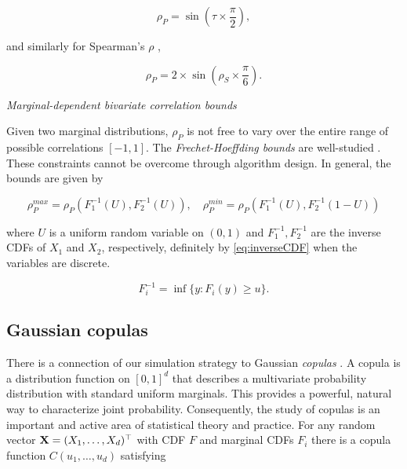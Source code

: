\documentclass[
]{jss}
\begin{document}
\begin{equation}
\label{eq:convertKendall}
\rho_{P} = \sin \left( \tau \times \frac{\pi}{2} \right), 
\end{equation}

\noindent and similarly for Spearman's \(\rho\) \citep{K58},

\begin{equation}
\label{eq:convertSpearman}
\rho_P = 2 \times \sin \left( \rho_S \times \frac{\pi}{6} \right).
\end{equation}

\emph{Marginal-dependent bivariate correlation bounds}

Given two marginal distributions, \(\rho_P\) is not free to vary over the entire range of possible correlations \([-1,1]\). The \emph{Frechet-Hoeffding bounds} are well-studied \citep{Nelsen2007, BF17}. These constraints cannot be overcome through algorithm design. In general, the bounds are given by

\begin{equation}
\label{eq:frechet}
\rho_P^{max} = \rho_P \left( F^{-1}_1 (U), F^{-1}_2 (U) \right), \quad \rho_P^{min} = \rho_P \left( F^{-1}_1 (U), F^{-1}_2 (1 - U) \right)
\end{equation}

\noindent where \(U\) is a uniform random variable on \((0,1)\) and \(F^{-1}_1, F^{-1}_2\) are the inverse CDFs of \(X_1\) and \(X_2\), respectively, definitely by \eqref{eq:inverseCDF} when the variables are discrete.

\begin{equation}
F_{i}^{-1} = \inf\{y:F_{i}(y) \geq u \}.
\label{eq:inverseCDF}
\end{equation}

\hypertarget{gaussian-copulas}{%
\subsection{Gaussian copulas}\label{gaussian-copulas}}

There is a connection of our simulation strategy to Gaussian \emph{copulas} \citep{Nelsen2007}. A copula is a distribution function on \([0,1]^d\) that describes a multivariate probability distribution with standard uniform marginals. This provides a powerful, natural way to characterize joint probability. Consequently, the study of copulas is an important and active area of statistical theory and practice. For any random vector \({\bf X}=(X_1, \ldots, X_d)^\top\) with CDF \(F\) and marginal CDFs \(F_i\) there is a copula function \(C(u_1, \ldots, u_d)\) satisfying
\end{document}
